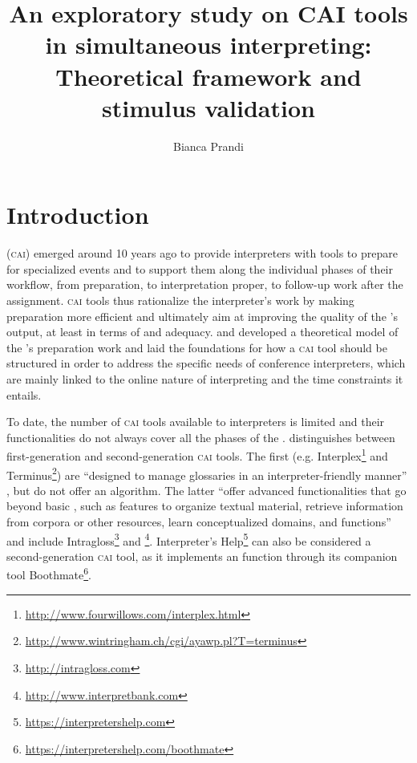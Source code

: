 \documentclass[output=paper]{langsci/langscibook}
\author{Bianca Prandi\affiliation{University of Mainz}}
\title{An exploratory study on CAI tools in simultaneous interpreting: Theoretical framework and stimulus validation}
\begin{document}
\section{Introduction}\label{sec:prandi:1}
 (\textsc{cai}) emerged around 10 years ago to provide interpreters with tools to prepare for specialized events and to support them along the individual phases of their workflow, from preparation, to interpretation proper, to follow-up work after the assignment. \textsc{cai} tools thus rationalize the interpret\-er’s  work by making preparation more efficient and ultimately aim at improving the quality of the ’s output, at least in terms of  and adequacy. \citet{Rütten2007} and \citet{Will2009} developed a theoretical model of the ’s preparation work and laid the foundations for how a \textsc{cai} tool should be structured in order to address the specific needs of conference interpreters, which are mainly linked to the online nature of interpreting and the time constraints it entails.

To date, the number of \textsc{cai} tools available to interpreters is limited and their functionalities do not always cover all the phases of the . \citet{Fantinuoli2018} distinguishes between first-generation and second-generation \textsc{cai} tools. The first (e.g. Interplex\footnote{\url{http://www.fourwillows.com/interplex.html}} and Terminus\footnote{\url{http://www.wintringham.ch/cgi/ayawp.pl?T=terminus}}) are ``designed to manage  glossaries in an interpreter-friendly manner'' \citep[164]{Fantinuoli2018}, but do not offer an  algorithm. The latter ``offer advanced functionalities that go beyond basic , such as features to organize textual material, retrieve information from corpora or other resources, learn conceptualized domains, and  functions'' \citep[164]{Fantinuoli2018} and include Intragloss\footnote{\url{http://intragloss.com}} and \footnote{\url{http://www.interpretbank.com}}. Interpreter’s Help\footnote{\url{https://interpretershelp.com}} can also be considered a second-generation \textsc{cai} tool, as it implements an  function through its companion tool Boothmate\footnote{\url{https://interpretershelp.com/boothmate}}. 
\end{document}
